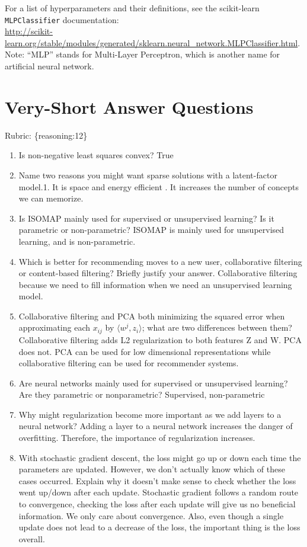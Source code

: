 \documentclass{article}
\def\rubric#1{\gre{Rubric: \{#1\}}}{}
\def\gre#1{{\color{gre}#1}}
\def\red#1{{\color{red}#1}}
\def\enum#1{\begin{enumerate}#1\end{enumerate}}
\begin{document}
For a list of hyperparameters and their definitions, see the scikit-learn \texttt{MLPClassifier} documentation:\\
\url{http://scikit-learn.org/stable/modules/generated/sklearn.neural_network.MLPClassifier.html}. Note: ``MLP'' stands for Multi-Layer Perceptron,
which is another name for artificial neural network.

\section{Very-Short Answer Questions}
\rubric{reasoning:12}

\enum{
\item Is non-negative least squares convex? \red{True}
\item Name two reasons you might want sparse solutions with a latent-factor model.\red{1. It is space and energy efficient \newline 2. It increases the number of concepts we can memorize.}
\item Is ISOMAP mainly used for supervised or unsupervised learning? Is it parametric or non-parametric?
\red{ISOMAP is mainly used for unsupervised learning, and is non-parametric.}
\item Which is better for recommending moves to a new user, collaborative filtering or content-based filtering? Briefly justify your answer. \red{Collaborative filtering because we need to fill information when we need an unsupervised learning model.}
\item Collaborative filtering and PCA both minimizing the squared error when approximating each $x_{ij}$ by $\langle w^j, z_i\rangle$; what are two differences between them? \red{Collaborative filtering adds L2 regularization to both features Z and W. PCA does not. PCA can be used for low dimensional representations while collaborative filtering can be used for recommender systems.}
\item{Are neural networks mainly used for supervised or unsupervised learning? Are they parametric or nonparametric? \red{Supervised, non-parametric}}
\item{Why might regularization become more important as we add layers to a neural network?
\red{Adding a layer to a neural network increases the danger of overfitting. Therefore, the importance of regularization increases.}}
\item With stochastic gradient descent, the loss might go up or down each time the parameters are updated. However, we don't actually know which of these cases occurred. Explain why it doesn't make sense to check whether the loss went up/down after each update. \red{Stochastic gradient follows a random route to convergence, checking the loss after each update will give us no beneficial information. We only care about convergence. Also, even though a single update does not lead to a decrease of the loss, the important thing is the loss overall.}
}
\end{document}
